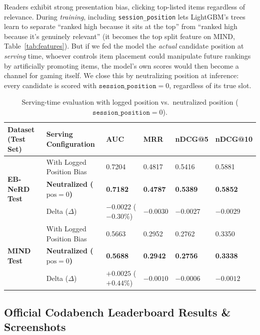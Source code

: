 \documentclass[11pt,a4paper]{article}
\begin{document}
Readers exhibit strong presentation bias, clicking top-listed items regardless of relevance. During \emph{training}, including \texttt{session\_position} lets LightGBM's trees learn to separate ``ranked high because it sits at the top'' from ``ranked high because it's genuinely relevant'' (it becomes the top split feature on MIND, Table~\ref{tab:features}). But if we fed the model the \emph{actual} candidate position at \emph{serving} time, whoever controls item placement could manipulate future rankings by artificially promoting items, the model's own scores would then become a channel for gaming itself. We close this by neutralizing position at inference: every candidate is scored with $\texttt{session\_position}{=}0$, regardless of its true slot.

\begin{table}[h!]
  \centering
  \caption{Serving-time evaluation with logged position vs.\ neutralized position ($\texttt{session\_position} = 0$).}
  \label{tab:antigaming}
  \small\setlength{\tabcolsep}{4pt}
  \begin{tabularx}{\linewidth}{l l X X X X}
    \toprule
    \textbf{Dataset (Test Set)} & \textbf{Serving Configuration} & \textbf{AUC} & \textbf{MRR} & \textbf{nDCG@5} & \textbf{nDCG@10} \\
    \midrule
    \multirow{3}{*}{\textbf{EB-NeRD Test}} 
      & With Logged Position Bias   & 0.7204 & 0.4817 & 0.5416 & 0.5881 \\
      & \textbf{Neutralized ($\text{pos}{=}0$)} & \textbf{0.7182} & \textbf{0.4787} & \textbf{0.5389} & \textbf{0.5852} \\
      & Delta ($\Delta$)            & $-0.0022$ ($-0.30\%$) & $-0.0030$ & $-0.0027$ & $-0.0029$ \\
    \midrule
    \multirow{3}{*}{\textbf{MIND Test}} 
      & With Logged Position Bias   & 0.5663 & 0.2952 & 0.2762 & 0.3350 \\
      & \textbf{Neutralized ($\text{pos}{=}0$)} & \textbf{0.5688} & \textbf{0.2942} & \textbf{0.2756} & \textbf{0.3338} \\
      & Delta ($\Delta$)            & $+0.0025$ ($+0.44\%$)  & $-0.0010$ & $-0.0006$ & $-0.0012$ \\
    \bottomrule
  \end{tabularx}
\end{table}

\subsection{Official Codabench Leaderboard Results \& Screenshots}
\end{document}
